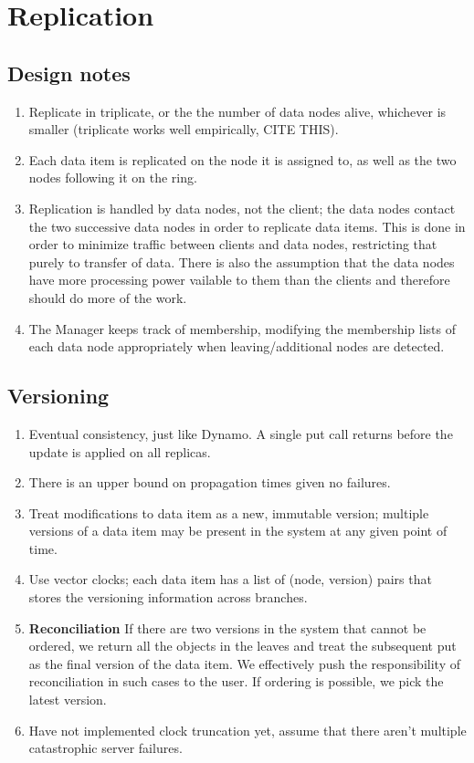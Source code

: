 \documentclass[paper=a4,fontsize=11pt]{report} %
\numberwithin{equation}{section} %
\numberwithin{figure}{section} %
\numberwithin{table}{section} %
\begin{document}
\section{Replication}
\subsection{Design notes}
\begin{enumerate}
\item Replicate in triplicate, or the the number of data nodes alive, whichever is smaller (triplicate works well empirically, CITE THIS).
\item Each data item is replicated on the node it is assigned to, as well as the two nodes following it on the ring.
\item Replication is handled by data nodes, not the client; the data nodes contact the two successive data nodes in order to replicate data items. This is done in order to minimize traffic between clients and data nodes, restricting that purely to transfer of data. There is also the assumption that the data nodes have more processing power vailable to them than the clients and therefore should do more of the work.
\item The Manager keeps track of membership, modifying the membership lists of each data node appropriately when leaving/additional nodes are detected.
\end{enumerate}

\subsection{Versioning}
\begin{enumerate}
\item Eventual consistency, just like Dynamo. A single put call returns before the update is applied on all replicas.
\item There is an upper bound on propagation times given no failures.
\item Treat modifications to data item as a new, immutable version; multiple versions of a data item may be present in the system at any given point of time.
\item Use vector clocks; each data item has a list of (node, version) pairs that stores the versioning information across branches.
\item \textbf{Reconciliation} If there are two versions in the system that cannot be ordered, we return all the objects in the leaves and treat the subsequent put as the final version of the data item. We effectively push the responsibility of reconciliation in such cases to the user. If ordering is possible, we pick the latest version.
\item Have not implemented clock truncation yet, assume that there aren't multiple catastrophic server failures.
\end{enumerate}
\end{document}
